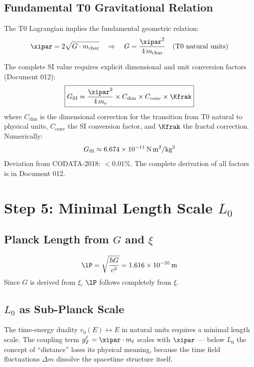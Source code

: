\subsection{Fundamental T0 Gravitational Relation}

The T0 Lagrangian implies the fundamental geometric relation:
\begin{equation}
	\xipar = 2\sqrt{G \cdot m_{\text{char}}}
	\quad \Rightarrow \quad
	G = \frac{\xipar^2}{4\, m_{\text{char}}} \quad \text{(T0 natural units)}
\end{equation}

The complete SI value requires explicit dimensional and unit conversion factors (Document 012):
\begin{equation}
	\boxed{G_{\text{SI}} = \frac{\xipar^2}{4\, m_e} \times C_{\text{dim}} \times C_{\text{conv}} \times \Kfrak}
\end{equation}
where $C_{\text{dim}}$ is the dimensional correction for the transition from T0 natural to physical units, $C_{\text{conv}}$ the SI conversion factor, and $\Kfrak$ the fractal correction. Numerically:
\begin{equation}
	G_{\text{SI}} \approx 6{.}674 \times 10^{-11}\,\text{N\,m}^2/\text{kg}^2
\end{equation}
Deviation from CODATA-2018: $< 0{.}01\%$. The complete derivation of all factors is in Document 012.

\section{Step 5: Minimal Length Scale \texorpdfstring{$L_0$}{L0}}

\subsection{Planck Length from \texorpdfstring{$G$}{G} and \texorpdfstring{$\xi$}{xi}}

\begin{equation}
	\lP = \sqrt{\frac{\hbar G}{c^3}} = 1{.}616 \times 10^{-35}\,\text{m}
\end{equation}
Since $G$ is derived from $\xi$, $\lP$ follows completely from $\xi$.

\subsection{\texorpdfstring{$L_0$}{L0} as Sub-Planck Scale}

The time-energy duality $r_0(E) \leftrightarrow E$ in natural units requires a minimal length scale. The coupling term $g_T^\ell = \xipar \cdot m_\ell$ scales with $\xipar$ — below $L_0$ the concept of ``distance'' loses its physical meaning, because the time field fluctuations $\Delta m$ dissolve the spacetime structure itself.


